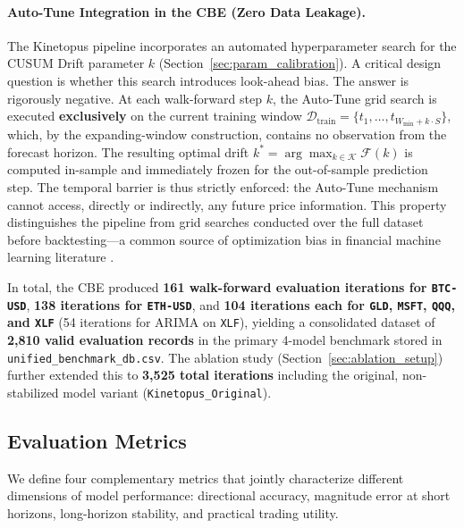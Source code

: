 \documentclass[11pt,a4paper]{article}
\begin{document}
\paragraph{Auto-Tune Integration in the CBE (Zero Data Leakage).}
The Kinetopus pipeline incorporates an automated hyperparameter search for the CUSUM Drift parameter $k$ (Section~\ref{sec:param_calibration}). A critical design question is whether this search introduces look-ahead bias. The answer is rigorously negative. At each walk-forward step $k$, the Auto-Tune grid search is executed \textbf{exclusively} on the current training window $\mathcal{D}_{\text{train}} = \{t_1, \ldots, t_{W_{\min}+k \cdot S}\}$, which, by the expanding-window construction, contains no observation from the forecast horizon. The resulting optimal drift $k^* = \arg\max_{k \in \mathcal{K}} \mathcal{F}(k)$ is computed in-sample and immediately frozen for the out-of-sample prediction step. The temporal barrier is thus strictly enforced: the Auto-Tune mechanism cannot access, directly or indirectly, any future price information. This property distinguishes the pipeline from grid searches conducted over the full dataset before backtesting---a common source of optimization bias in financial machine learning literature \cite{lopez2018advances}.

In total, the CBE produced \textbf{161 walk-forward evaluation iterations for \texttt{BTC-USD}}, \textbf{138 iterations for \texttt{ETH-USD}}, and \textbf{104 iterations each for \texttt{GLD}, \texttt{MSFT}, \texttt{QQQ}, and \texttt{XLF}} (54 iterations for ARIMA on \texttt{XLF}), yielding a consolidated dataset of \textbf{2,810 valid evaluation records} in the primary 4-model benchmark stored in \texttt{unified\_benchmark\_db.csv}. The ablation study (Section~\ref{sec:ablation_setup}) further extended this to \textbf{3,525 total iterations} including the original, non-stabilized model variant (\texttt{Kinetopus\_Original}).

\subsection{Evaluation Metrics}

We define four complementary metrics that jointly characterize different dimensions of model performance: directional accuracy, magnitude error at short horizons, long-horizon stability, and practical trading utility.
\end{document}
